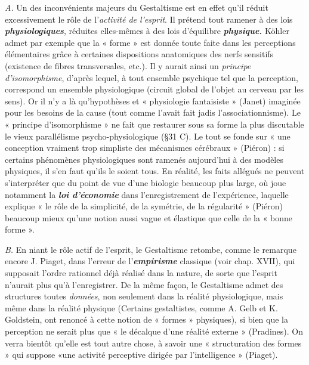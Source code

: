 {\it A.} Un des inconvénients majeurs du Gestaltisme est en effet qu’il
réduit excessivement le rôle de l'{\it activité de l'esprit}. Il prétend tout
ramener à des lois \textbf{\textit {physiologiques}}, réduites elles-mêmes à des lois
d'équilibre \textbf{\textit {physique.}} Köhler admet par exemple que la « forme »
est donnée toute faite dans les perceptions élémentaires grâce à certaines
dispositions anatomiques des nerfs sensitifs (existence de fibres
transversales, etc.). Il y aurait ainsi un {\it principe d’isomorphisme},
d’après lequel, à tout ensemble psychique tel que la perception, correspond
un ensemble physiologique (circuit global de l’objet au cerveau
par les sens). Or il n’y a là qu'hypothèses et « physiologie fantaisiste »
(Janet) imaginée pour les besoins de la cause (tout comme
l'avait fait jadis l’associationnisme). Le « principe d’isomorphisme »
ne fait que restaurer sous sa forme la plus discutable le vieux parallélisme
psycho-physiologique (\S 31 C). Le tout se fonde sur « une
conception vraiment trop simpliste des mécanismes cérébraux » (Piéron) :
si certains phénomènes physiologiques sont ramenés aujourd’hui
à des modèles physiques, il s’en faut qu’ils le soient tous. En
réalité, les faits allégués ne peuvent s'interpréter que du point de
vue d’une biologie beaucoup plus large, où joue notamment la \textbf{\textit {loi
d'économie}} dans l’enregistrement de l'expérience, laquelle explique
« le rôle de la simplicité, de la symétrie, de la régularité » (Piéron)
beaucoup mieux qu’une notion aussi vague et élastique que celle de
la « bonne forme ».

{\it B.} En niant le rôle actif de l’esprit, le Gestaltisme retombe, comme
le remarque encore J. Piaget, dans l’erreur de l’\textbf{\textit {empirisme}} classique
(voir chap. XVII), qui supposait l’ordre rationnel déjà réalisé dans
la nature, de sorte que l’esprit n’aurait plus qu’à l’enregistrer. De la
même façon, le Gestaltisme admet des structures toutes {\it données}, non
seulement dans la réalité physiologique, mais même dans la réalité
physique
{\scriptsize (Certains gestaltistes, comme A. Gelb et K. Goldstein, ont renoncé à cette notion
de « formes » physiques)},
si bien que la perception ne serait plus que « le décalque
d’une réalité externe » (Pradines). On verra bientôt qu’elle est tout
autre chose, à savoir une « structuration des formes » qui suppose «une
activité perceptive dirigée par l'intelligence » (Piaget).

